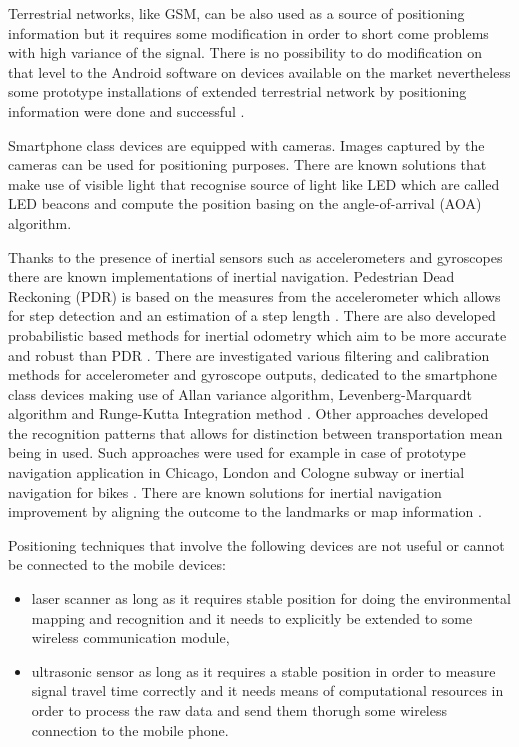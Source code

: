 \documentclass[../main.tex]{subfiles}
\begin{document}
Terrestrial networks, like GSM, can be also used as a source of positioning information but it requires some modification in order to short come problems with high variance of the signal. There is no possibility to do modification on that level to the Android software on devices available on the market nevertheless some prototype installations of extended terrestrial network by positioning information were done and successful \cite{terrestrial_positioning}\cite{terrestrial_positioning_tdoa}.

Smartphone class devices are equipped with cameras. Images captured by the cameras can be used for positioning purposes. There are known solutions that make use of visible light \cite{visible_light_positioning} that recognise source of light like LED which are called LED beacons and compute the position basing on the angle-of-arrival (AOA) algorithm.

Thanks to the presence of inertial sensors such as accelerometers and gyroscopes there are known implementations of inertial navigation. Pedestrian Dead Reckoning (PDR) is based on the measures from the accelerometer which allows for step detection and an estimation of a step length \cite{inertial_navi_unaided} \cite{inertial_navi_pocket} \cite{inertial_navi_velocity_model}. There are also developed probabilistic based methods for inertial odometry which aim to be more accurate and robust than PDR \cite{article_inertial_navi_handheld_prob}. There are investigated various filtering and calibration methods for accelerometer and gyroscope outputs, dedicated to the smartphone class devices making use of Allan variance algorithm, Levenberg-Marquardt algorithm and Runge-Kutta Integration method \cite{article_intertial_test_smartphone_calibration}\cite{article_intertial_calibration}.  Other approaches developed the recognition patterns that allows for distinction between transportation mean being in used. Such approaches were used for example in case of prototype navigation application in Chicago, London and Cologne subway \cite{inertial_navi_subway} or inertial navigation for bikes \cite{inertial_navi_bike}. There are known solutions for inertial navigation improvement by aligning the outcome to the landmarks or map information \cite{positioning_tests}.

Positioning techniques that involve the following devices are not useful or cannot be connected to the mobile devices:
\begin{itemize}
	\item laser scanner as long as it requires stable position for doing the environmental mapping and recognition and it needs to explicitly be extended to some wireless communication module,
	\item ultrasonic sensor as long as it requires a stable position in order to measure signal travel time correctly and it needs means of computational resources in order to process the raw data and send them thorugh some wireless connection to the mobile phone.
\end{itemize}
\end{document}
